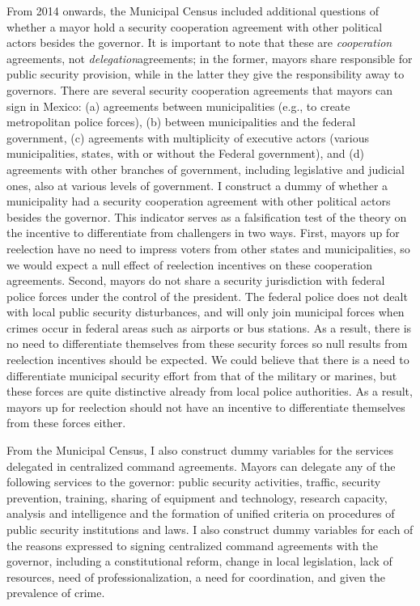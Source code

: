 From 2014 onwards, the Municipal Census included additional questions of whether a mayor hold a security  cooperation agreement with other political actors besides the governor. It is important to note that these are \emph{cooperation} agreements, not \emph{delegation}agreements; in the former, mayors share responsible for public security provision, while in the latter they give the responsibility away to governors. There are several security cooperation agreements that mayors can sign in Mexico: (a) agreements between municipalities (e.g., to create metropolitan police forces), (b) between municipalities and the federal government, (c) agreements with multiplicity of executive actors (various municipalities, states, with or without the Federal government), and (d) agreements with other branches of government, including legislative and judicial ones, also at various levels of government. I construct a dummy of whether a municipality had a security cooperation agreement with other political actors besides the governor. This indicator serves as a falsification test of the theory on the incentive to differentiate from challengers in two ways. First, mayors up for reelection have no need to impress voters from other states and municipalities, so we would expect a null effect of reelection incentives on these cooperation agreements. Second, mayors do not share a security jurisdiction with federal police forces under the control of the president. The federal police does not dealt with local public security disturbances, and will only join municipal forces when crimes occur in federal areas such as airports or bus stations. As a result, there is no need to differentiate themselves from these security forces so null results from reelection incentives should be expected. We could believe that there is a need to differentiate municipal security effort from that of the military or marines, but these forces are quite distinctive already from local police authorities. As a result, mayors up for reelection should not have an incentive to differentiate themselves from these forces either. 

From the Municipal Census, I also construct dummy variables for the services delegated in centralized command agreements.  Mayors can delegate any of the following services to the governor: public security activities, traffic, security prevention, training, sharing of equipment and technology, research capacity, analysis and intelligence and the formation of unified criteria on procedures of public security institutions and laws. I also construct dummy variables for each of the reasons expressed to signing centralized command agreements with the governor, including a constitutional reform, change in local legislation, lack of resources, need of professionalization, a need for coordination, and given the prevalence of crime.
 

